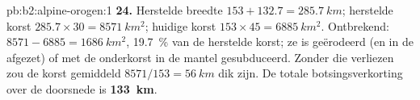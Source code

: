 \begin{solution}{pb:b2:alpine-orogen:1}
\textbf{24.} Herstelde breedte $153 + 132.7 = \qty{285.7}{km}$; herstelde korst
$285.7\times30 = \qty{8571}{km^2}$; huidige korst $153\times45 = \qty{6885}{km^2}$. Ontbrekend:
$8571 - 6885 = \qty{1686}{km^2}$, \qty{19.7}{\percent} van de herstelde korst; ze is
geërodeerd (en in de  afgezet) of met de onderkorst in de
mantel gesubduceerd. Zonder die verliezen zou de korst gemiddeld $8571/153 = \qty{56}{km}$ dik zijn.
De totale botsingsverkorting over de doorsnede is
\textbf{\qty[text-series-to-math=true]{133}{km}}.
\end{solution}
